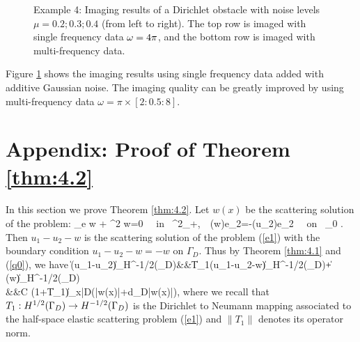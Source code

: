 \documentclass[12pt]{iopart}
\begin{document}
{\begin{figure}
	\caption{Example 4: Imaging results of a Dirichlet obstacle with noise levels $\mu =  0.2; 0.3; 0.4$ (from left to
		right). The top row is imaged with single frequency data $\omega=4\pi$, and the
		bottom row is imaged with multi-frequency data.}\label{figure_4}
\end{figure}

Figure \ref{figure_4} shows the imaging results using single frequency data added with additive
Gaussian noise. The imaging quality can be greatly improved by using multi-frequency data $\omega = \pi\times [2:0.5:8]$.

\section{Appendix: Proof of Theorem \ref{thm:4.2}}

In this section we prove Theorem \ref{thm:4.2}.
Let $w(x)$ be the scattering solution of the problem:
\be\label{f2}
\Delta_e w + \omega^2 w=0 \ \ \mbox{\rm in } \R^2_+,\ \ 
\sigma(w)e_2=-\sigma(u_2)e_2 \ \ \mbox{\rm on } \Ga_0 .
\ee
Then $u_1-u_2-w$ is the scattering solution of the problem (\ref{e1}) with the boundary condition $u_1-u_2-w=-w$ on $\Gamma_D$. Thus by Theorem \ref{thm:4.1} and (\ref{q0}), we have
\be
\hskip-1cm\|\sigma(u_1-u_2)\nu\|_{H^{-1/2}(\Gamma_D)}&\leq&\|T_1(u_1-u_2-w)\|_{H^{-1/2}(\Gamma_D)}+\|\sigma(w)\nu\|_{H^{-1/2}(\Gamma_D)}\nn\\
&\leq&C (1+\|T_1\|)\max_{x\in \bar D}(|w(x)|+d_D|\nabla w(x)|),\label{f5}
\ee
where we recall that $T_1:H^{1/2}(\Gamma_D)\to H^{-1/2}(\Gamma_D)$ is the Dirichlet to Neumann mapping associated to the half-space elastic scattering problem (\ref{e1}) and $\|T_1\|$ denotes its operator norm.

}
\end{document}
